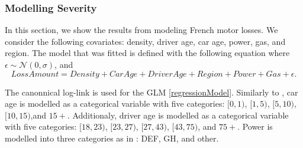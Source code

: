 \documentclass[11pt,letterpaper]{article}
\numberwithin{equation}{section}
\numberwithin{equation}{section}
\numberwithin{equation}{section}
\begin{document}
\subsubsection{Modelling Severity}
In this section, we show the results from modeling French motor losses. We consider the following covariates: density, driver age, car age, power, gas,  and region. %
The model that was fitted is defined with the following equation where $\epsilon \sim \mathcal{N}(0,\sigma)$, and
\begin{equation}
Loss Amount =  Density + Car Age + Driver Age + Region + Power + Gas + \epsilon. \label{regressionModel}
\end{equation}

The canonnical log-link is used for the GLM \eqref{regressionModel}. Similarly to \cite{risks_miljkovic},
car age is modelled as a categorical variable with five categories: $[0,1)$, $[1,5)$, $[5,10)$, $[10,15)$,and $15+$. Additionaly, driver age is modelled as a categorical variable with five categories: $[18,23)$, $[23,27)$, $[27,43)$, $[43,75)$, and $75+$. Power is modelled into three categories as in \cite{Charpentier:2014}:
DEF, GH, and other. 
\end{document}
